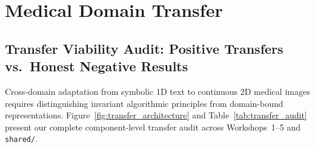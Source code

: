 \section{Medical Domain Transfer}
\label{sec:domain_transfer}

\subsection{Transfer Viability Audit: Positive Transfers vs.\ Honest Negative Results}
Cross-domain adaptation from symbolic 1D text to continuous 2D medical images requires distinguishing invariant algorithmic principles from domain-bound representations. Figure~\ref{fig:transfer_architecture} and Table~\ref{tab:transfer_audit} present our complete component-level transfer audit across Workshops~1--5 and \texttt{shared/}.



